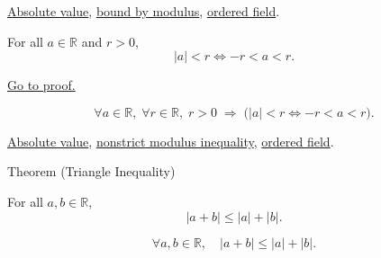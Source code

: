 \begin{dependencies}
\hyperref[def:absolute-value]{Absolute value},
\hyperref[thm:absolute-value-bounds]{bound by modulus},
\hyperref[def:real-ordered-field]{ordered field}.
\end{dependencies}


\begin{theorem}
\label{thm:absolute-value-lt-iff}
For all $a \in \mathbb{R}$ and $r > 0$,
\[
  \lvert a \rvert < r \iff -r < a < r.
\]
\end{theorem}



\begin{remark*}[Proof]
\hyperref[prf:absolute-value-lt-iff]{Go to proof.}
\end{remark*}

\begin{remark*}
\[
  \forall a \in \mathbb{R},\;
  \forall r \in \mathbb{R},\;
  r > 0 \;\Rightarrow\;
  \bigl(\lvert a \rvert < r \iff -r < a < r\bigr).
\]
\end{remark*}

\begin{dependencies}
\hyperref[def:absolute-value]{Absolute value},
\hyperref[thm:absolute-value-le-iff]{nonstrict modulus inequality},
\hyperref[def:real-ordered-field]{ordered field}.
\end{dependencies}


\begin{theorembox}{Theorem (Triangle Inequality)}
\begin{theorem*}
For all $a, b \in \mathbb{R}$,
\[
  \lvert a + b \rvert \le \lvert a \rvert + \lvert b \rvert.
\]
\end{theorem*}
\end{theorembox}



\begin{remark*}
\[
  \forall a, b \in \mathbb{R},\quad
  \lvert a + b \rvert \le \lvert a \rvert + \lvert b \rvert.
\]
\end{remark*}

